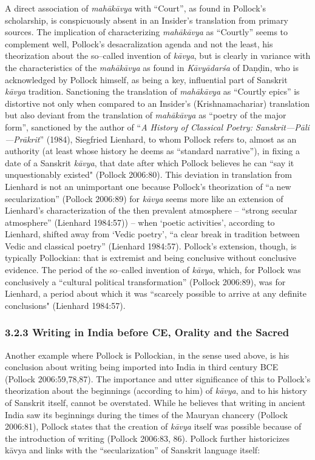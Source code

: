 A direct association of \textit{mahākāvya} with “Court”, as found in Pollock’s scholarship, is conspicuously absent in an Insider’s translation from primary sources. The implication of characterizing \textit{mahākāvya} as “Courtly” seems to complement well, Pollock’s desacralization agenda and not the least, his theorization about the so–called invention of \textit{kāvya}, but is clearly in variance with the characteristics of the \textit{mahākāvya} as found in \textit{Kāvyādarśa} of Daṇḍin, who is acknowledged by Pollock himself, as being a key, influential part of Sanskrit \textit{kāvya} tradition. Sanctioning the translation of \textit{mahākāvya} as “Courtly epics” is distortive not only when compared to an Insider’s (Krishnamachariar) translation but also deviant from the translation of \textit{mahākāvya} as “poetry of the major form”, sanctioned by the author of “\textit{A History of Classical Poetry: Sanskrit—Pāli—Prākrit}”\textit{} (1984), Siegfried Lienhard, to whom Pollock refers to, almost as an authority (at least whose history he deems as “standard narrative”), in fixing a date of a Sanskrit \textit{kāvya}, that date after which Pollock believes he can “say it unquestionably existed" (Pollock 2006:80). This deviation in translation from Lienhard is not an unimportant one because Pollock’s theorization of “a new secularization” (Pollock 2006:89) for \textit{kāvya} seems more like an extension of Lienhard’s characterization of the then prevalent atmosphere – “strong secular atmosphere” (Lienhard 1984:57)) – when ‘poetic activities’, according to Lienhard, shifted away from ‘Vedic poetry’, “a clear break in tradition between Vedic and classical poetry” (Lienhard 1984:57). Pollock’s extension, though, is typically Pollockian: that is extremist and being conclusive without conclusive evidence. The period of the so–called invention of \textit{kāvya}, which, for Pollock was conclusively a “cultural political transformation” (Pollock 2006:89), was for Lienhard, a period about which it was “scarcely possible to arrive at any definite conclusions" (Lienhard 1984:57).


\subsubsection*{3.2.3 Writing in India before CE, Orality and the Sacred}

Another example where Pollock is Pollockian, in the sense used above, is his conclusion about writing being imported into India in third century BCE (Pollock 2006:59,78,87). The importance and utter significance of this to Pollock’s theorization about the beginnings (according to him) of \textit{kāvya}, and to his history of Sanskrit itself, cannot be overstated. While he believes that writing in ancient India saw its beginnings during the times of the Mauryan chancery (Pollock 2006:81), Pollock states that the creation of \textit{kāvya} itself was possible because of the introduction of writing (Pollock 2006:83, 86). Pollock further historicizes kāvya and links with the “secularization” of Sanskrit language itself:

